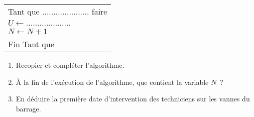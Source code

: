 \begin{enumerate}
\begin{center}
\begin{extern}
\begin{tabular}{|p{5cm}|}
                    Tant que ..................... faire\\
                    \hspace{1cm} $U \leftarrow ....................$\\
                    \hspace{1cm} $N\leftarrow N+1$\\
                    Fin Tant que\\
                    \hline
               \end{tabular}
          \end{extern}
     \end{center}
     \begin{enumerate}[label=\alph*.]
          \item Recopier et compléter l'algorithme.
          \item À la fin de l'exécution de l'algorithme, que contient la variable $N$~?
          \item En déduire la première date d'intervention des techniciens sur les vannes du barrage.
     \end{enumerate}
\end{enumerate}

